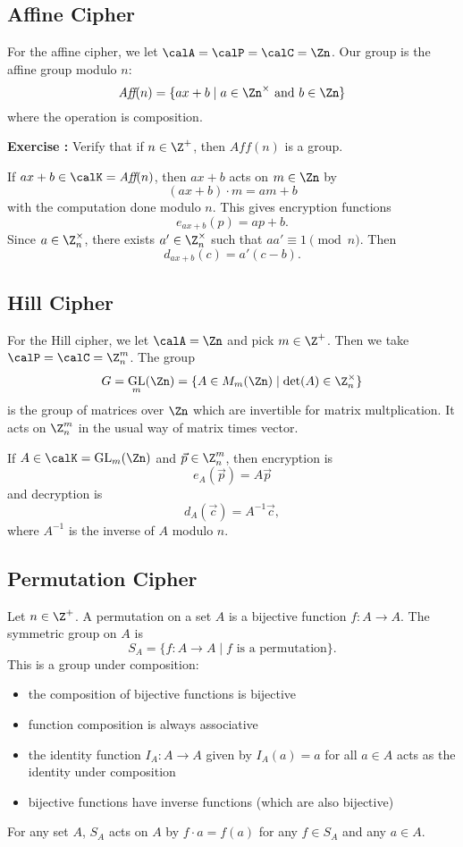 \documentclass[12pt]{amsart}
\newcommand{\terminology}[1]{\textbf{\textit{#1}}}
\renewcommand{\terminology}[1]{#1}
\newcommand{\term}{\terminology}
\DeclareMathOperator{\GL}{GL}
\newcounter{probs}
\newenvironment{prob}{%
  \refstepcounter{probs}
  \par\medskip\noindent\textbf{Exercise \theprobs:} }{\par\medskip}
\theoremstyle{plain}
\theoremstyle{definition}
\theoremstyle{remark}
\begin{document}
\subsection{Affine Cipher}
For the \term{affine cipher}, we let $\calA=\calP=\calC=\Zn$.
Our group is
the \term{affine group modulo $n$}:
\[ \textit{Aff}(n) = \{ ax+b\mid a\in \Zn^\times\text{ and } b\in\Zn\}\]
where the operation is composition.
\begin{prob}
  Verify that if $n\in\Z^+$, then $\textit{Aff}(n)$ is a group.
\end{prob}
If $ax+b\in \calK= \textit{Aff}(n)$, then $ax+b$ acts on $m\in \Zn$ by
\[ (ax+b)\cdot m = am+b\]
with the computation done modulo $n$.  This gives encryption functions
\[ e_{ax+b}(p) = ap+b.\]
Since $a\in \Z_n^\times$,
there exists $a'\in\Z_n^\times$ such that $aa'\equiv 1\pmod n$.  Then
\[d_{ax+b}(c) = a'(c-b).\]

\subsection{Hill Cipher}
For the \term{Hill cipher}, we let $\calA=\Zn$ and pick
$m\in\Z^+$.  Then we take $\calP=\calC=\Z_n^m$.
The group 
\[ G=\GL_m(\Zn)=\{A\in M_m(\Zn)\mid \det(A)\in \Z_n^\times\}\]
is the group of matrices over $\Zn$ which are invertible for matrix
multplication.  It acts on $\Z_n^m$ in the usual way of matrix times
vector.

If $A\in \calK=\GL_m(\Zn)$ and $\vec p \in \Z_n^m$, then encryption is
\[ e_A(\vec p) = A\vec p\]
and decryption is
\[ d_A(\vec c) = A^{-1}\vec c,\]
where $A^{-1}$ is the inverse of $A$ modulo $n$.


\subsection{Permutation Cipher}
Let $n\in\Z^+$.  A \term{permutation} on a set $A$ is a bijective
function $f:A\to A$.  The \term{symmetric group} on $A$ is
\[ S_A = \{ f:A\to A\mid \text{$f$ is a permutation}\}.\]
This is a group under composition:
\begin{itemize}
\item the composition of bijective functions is bijective
\item function composition is always associative
\item the identity function $I_A:A\to A$ given by $I_A(a)=a$ for all
  $a\in A$ acts as the identity under composition
\item bijective functions have inverse functions (which are also bijective)
\end{itemize}
For any set $A$, $S_A$ acts on $A$ by $f\cdot a=f(a)$ for any $f\in S_A$ and any
$a\in A$.
\end{document}
